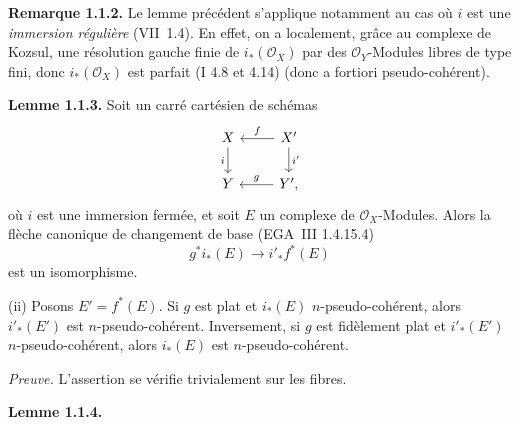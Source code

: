 \textbf{Remarque 1.1.2.} Le lemme précédent s'applique notamment au cas où \(i\) est une \emph{immersion régulière} (VII~1.4). En effet, on a localement, grâce au complexe de Kozsul, une résolution gauche finie de \(i_*(\mathcal O_X)\) par des \(\mathcal O_Y\)-Modules libres de type fini, donc \(i_*(\mathcal O_X)\) est parfait (I 4.8 et 4.14) (donc a fortiori pseudo-cohérent).

\textbf{Lemme 1.1.3.} Soit un carré cartésien de schémas
\[
\begin{tikzcd}
X \arrow[d,"i"'] & X' \arrow[l,"f"'] \arrow[d,"i'"]\\
Y & Y'{,} \arrow[l,"g"']
\end{tikzcd}
\]
où \(i\) est une immersion fermée, et soit \(E\) un complexe de \(\mathcal O_X\)-Modules. Alors la flèche canonique de changement de base (EGA~III 1.4.15.4)
\[
  g^*i_*(E)\longrightarrow i'_*f^*(E)
\]
est un isomorphisme.

(ii) Posons \(E'=f^*(E)\). Si \(g\) est plat et \(i_*(E)\) \(n\)-pseudo-cohérent, alors \(i'_*(E')\) est \(n\)-pseudo-cohérent. Inversement, si \(g\) est fidèlement plat et \(i'_*(E')\) \(n\)-pseudo-cohérent, alors \(i_*(E)\) est \(n\)-pseudo-cohérent.

\emph{Preuve.} L'assertion se vérifie trivialement sur les fibres.

\textbf{Lemme 1.1.4.}
